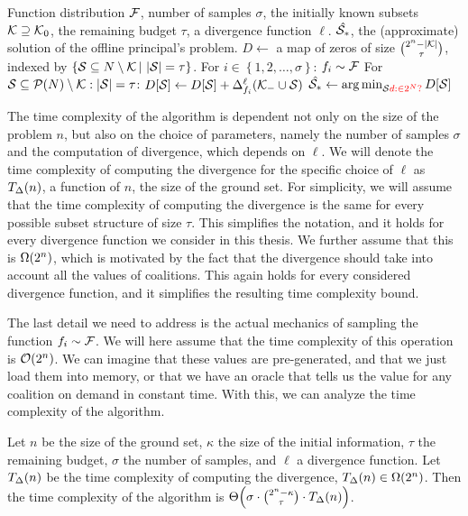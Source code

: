 \begin{algor}{\label{alg:fo}\algFO{}}{Function distribution $ \fdist $, number of samples $ \sigma $, the initially known subsets $ \k \supseteq \k_0 $, the remaining budget $ \tau $, a divergence function $ \ell $.}
  {$ \hat{\s_*} $, the (approximate) solution of the offline principal's problem.}
  \State $ D \gets $ a map of zeros of size $ \binom{2^n-\absolute{\k}}{\tau} $, indexed by $ \left\{ \s \subseteq N \setminus \k \suchthat \absolute{\s} = \tau \right\} $.
  \Indent For $ i \in \left\{ 1, 2, \ldots, \sigma \right\} $:
    \State $ f_i \sim \fdist $
    \Indent For $ \s \subseteq \pot{N} \setminus \k: \absolute{\s} = \tau $:
    \State $ D[\s] \gets D[\s] + \divg[f_i] \ell {\k_- \cup \s} $
    \EndIndent
  \EndIndent
  \State $ \hat{\s_*} \gets \argmin_{\s\david{\in 2^N?}} D[\s] $
\end{algor}

The time complexity of the \algFO{} algorithm is dependent not only on the size of the problem $ n $, but also on the choice of parameters, namely the number of samples $ \sigma $ and the computation of divergence, which depends on $ \ell $.
We will denote the time complexity of computing the divergence for the specific choice of $ \ell $ as $ \fce\divt{n} $, a function of $ n $, the size of the ground set.
For simplicity, we will assume that the time complexity of computing the divergence is the same for every possible subset structure of size $ \tau $.
This simplifies the notation, and it holds for every divergence function we consider in this thesis.
We further assume that this is $ \fce{\Omega}{2^n} $, which is motivated by the fact that the divergence should take into account all the values of coalitions.
This again holds for every considered divergence function, and it simplifies the resulting time complexity bound.

The last detail we need to address is the actual mechanics of sampling the function $ f_i \sim \fdist $.
We will here assume that the time complexity of this operation is $ \fce{\O}{2^n} $.
We can imagine that these values are pre-generated, and that we just load them into memory, or that we have an oracle that tells us the value for any coalition on demand in constant time.
With this, we can analyze the time complexity of the \algFO{} algorithm.

\begin{prop}
  \label{thm:algfo-time-complexity}
  Let $ n $ be the size of the ground set, $ \kappa $ the size of the initial information, $ \tau $ the remaining budget, $ \sigma $ the number of samples, and $ \ell $ a divergence function.
  Let $ \fce\divt{n} $ be the time complexity of computing the divergence, $ \fce{\divt}{n} \in \fce{\Omega}{2^n} $.
  Then the time complexity of the \algFO{} algorithm is $ \fce\Theta{\sigma \cdot \binom{2^n-\kappa}{\tau} \cdot \fce\divt{n}} $.
\end{prop}


